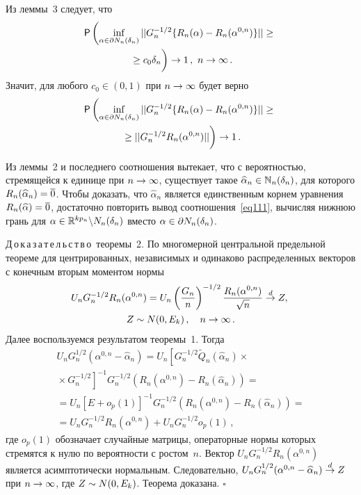 \begin{multicols}{2}
Из леммы~3 следует, что
\begin{multline}
\p\left(\inf\limits_{\alpha\in\partial N_n(\delta_n)}||G_n^{-1/2}\{R_n(\alpha)-
R_n(\alpha^{0,n})\}||\geq{}\right.\\
\left.{}\geq c_0\delta_n \vphantom{\inf\limits_{\alpha\in\partial N_n(\delta_n)}}
\right)\rightarrow 1\,,\ n\rightarrow\infty\,.
\label{eq111}
\end{multline}
Значит, для любого $c_0\in(0,1)$ при $n\hm\rightarrow\infty$ будет верно
\begin{multline*}
\p\left(\inf\limits_{\alpha\in\partial N_n(\delta_n)}||G_n^{-1/2}\{R_n(\alpha)-
R_n(\alpha^{0,n})\}||\geq{}\right.\\
\left.{}\geq ||G_n^{-1/2}R_n(\alpha^{0,n})||
\vphantom{\inf\limits_{\alpha\in\partial N_n(\delta_n)}}
\right)\rightarrow1\,.
\end{multline*}

Из леммы~2 и последнего соотношения вытекает, что с вероятностью, стремящейся к единице 
при $n\hm\rightarrow\infty$, существует такое $\widehat{\alpha}_n\hm\in\N_n(\delta_n)$, 
для которого $R_n(\widehat{\alpha}_n)\hm=\overline{0}$. Чтобы доказать, 
что $\widehat{\alpha}_n$ является единственным корнем уравнения 
$R_n(\widehat{\alpha})\hm=\overline{0}$, достаточно повторить вывод соотношения~\eqref{eq111}, 
вычисляя нижнюю грань для $\alpha\hm\in\R^{kp_n}\backslash N_n(\delta_n)$ вместо 
$\alpha\hm\in\partial N_n(\delta_n)$.


\medskip

\noindent
Д\,о\,к\,а\,з\,а\,т\,е\,л\,ь\,с\,т\,в\,о\ теоремы~2.
По многомерной центральной предельной теореме для центрированных, независимых и 
одинаково распределенных векторов с конечным вторым моментом нормы
\begin{multline*}
\hspace*{-3pt}U_nG_n^{-1/2}R_n(\alpha^{0,n})=U_n\left(\displaystyle\frac{\displaystyle G_n\mathstrut}{\displaystyle n\mathstrut}\right)^{-1/2}
\displaystyle\frac{\displaystyle R_n(\alpha^{0,n})\mathstrut}{\displaystyle \sqrt{n}\mathstrut}\stackrel{d}\rightarrow Z,\\  
Z\sim N(0,E_k)\,, \quad
n\rightarrow\infty\,.
\end{multline*}
Далее воспользуемся результатом теоремы~1. Тогда
\begin{multline*}
U_nG_n^{1/2}(\alpha^{0,n}-\widehat{\alpha}_n)=
U_n\left[G_n^{-1/2}\widetilde{Q}_n(\widehat{\alpha}_n)\times{}\right.\\
\left.{}\times G_n^{-1/2}\right]^{-1}G_n^{-1/2}
\left(R_n(\alpha^{0,n})-R_n(\widehat{\alpha}_n)\right)={}\\
{}=U_n\left[E+o_p(1)\right]^{-1}G_n^{-1/2}\left(R_n(\alpha^{0,n})-R_n(\widehat{\alpha}_n)\right)={}\\
{}=U_nG_n^{-1/2}R_n(\alpha^{0,n})+U_nG_n^{-1/2}o_p(1)\,,
\end{multline*}
где $o_p(1)$ обозначает случайные матрицы, операторные нормы которых стремятся 
к нулю по вероятности с ростом~$n$. Вектор $U_nG_n^{-1/2}R_n(\alpha^{0,n})$ является 
асимптотически нормальным. Следовательно, $U_nG_n^{1/2}(\alpha^{0,n}\hm-\widehat{\alpha}_n)
\stackrel{d}{\rightarrow}Z$ при $n\hm\rightarrow\infty$, где $Z\hm\sim N(0,E_k)$. 
Теорема доказана. \hfill $\square$


\end{multicols}

